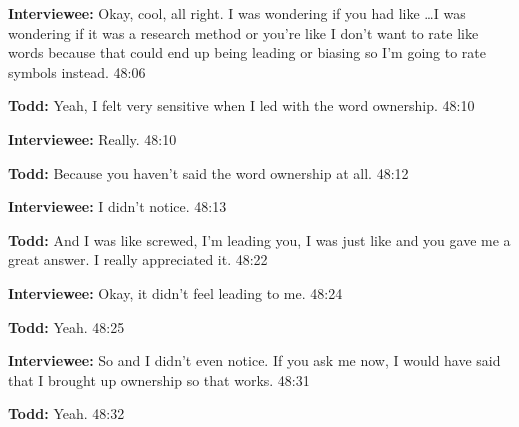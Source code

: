\textbf{Interviewee:} Okay, cool, all right.  I was wondering if you had like \ldots I was wondering if it was a research method or you're like I don't want to rate like words because that could end up being leading or biasing so I'm going to rate symbols instead.  48:06

\textbf{Todd:} Yeah, I felt very sensitive when I led with the word ownership.  48:10

\textbf{Interviewee:} Really.  48:10

\textbf{Todd:} Because you haven't said the word ownership at all.  48:12

\textbf{Interviewee:} I didn't notice.  48:13

\textbf{Todd:} And I was like screwed, I'm leading you, I was just like and you gave me a great answer.  I really appreciated it.  48:22

\textbf{Interviewee:} Okay, it didn't feel leading to me.  48:24

\textbf{Todd:} Yeah.  48:25

\textbf{Interviewee:} So and I didn't even notice.  If you ask me now, I would have said that I brought up ownership so that works.  48:31

\textbf{Todd:} Yeah.  48:32
